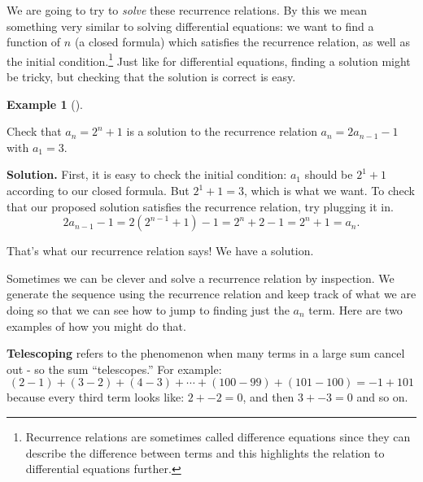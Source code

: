 \documentclass[10pt,]{book}
\newcommand{\terminology}[1]{\textbf{#1}}
\theoremstyle{plain}
\theoremstyle{definition}
\newtheorem{example}[theorem]{Example}
\theoremstyle{definition}
\theoremstyle{definition}
\numberwithin{equation}{chapter}
\begin{document}
We are going to try to \emph{solve} these recurrence relations. By this we mean something very similar to solving differential equations: we want to find a function of \(n\) (a closed formula) which satisfies the recurrence relation, as well as the initial condition.\footnote{Recurrence relations are sometimes called difference equations since they can describe the difference between terms and this highlights the relation to differential equations further.\label{fn-5}} Just like for differential equations, finding a solution might be tricky, but checking that the solution is correct is easy.
%
\begin{example}[]\label{example-73}

Check that \(a_n = 2^n + 1\) is a solution to the recurrence relation \(a_n = 2a_{n-1} - 1\) with \(a_1 = 3\).
%
\par\medskip\noindent%
\textbf{Solution.}\quad
First, it is easy to check the initial condition: \(a_1\) should be \(2^1 + 1\) according to our closed formula. But \(2^1 + 1 = 3\), which is what we want. To check that our proposed solution satisfies the recurrence relation, try plugging it in.
\begin{equation*}
  2a_{n-1} - 1 = 2(2^{n-1} + 1) - 1 = 2^n + 2 - 1 = 2^n +1 = a_n.
\end{equation*}
%
\par

That's what our recurrence relation says! We have a solution.
%
\end{example}
\par

Sometimes we can be clever and solve a recurrence relation by inspection. We generate the sequence using the recurrence relation and keep track of what we are doing so that we can see how to jump to finding just the \(a_n\) term. Here are two examples of how you might do that.
%
\par

\terminology{Telescoping} refers to the phenomenon when many terms in a large sum cancel out - so the sum ``telescopes.'' For example:
\begin{equation*}
  (2 - 1) + (3 - 2) + (4 - 3) + \cdots + (100 - 99) + (101 - 100) = -1 + 101
\end{equation*}
because every third term looks like: \(2 + -2 = 0\), and then \(3 + -3 = 0\) and so on.
%
\par
\end{document}
